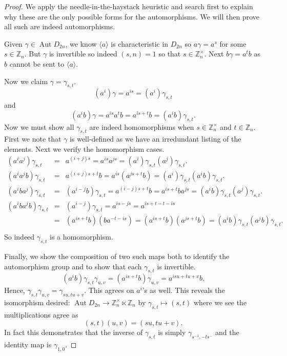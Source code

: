 \documentclass[12pt]{article}
\DeclareMathOperator{\Aut}{Aut }
\begin{document}
\begin{proof}
We apply the needle-in-the-haystack heuristic and search first to
explain why these are the only possible forms for the automorphisms.
We will then prove all such are indeed automorphisms.

Given $\gamma\in \Aut D_{2n}$, we know $\langle a\rangle$ is characteristic
in $D_{2n}$ so $a\gamma=a^s$ for some $s\in \mathbb{Z}_n$.  But $\gamma$ is invertible
so indeed $(s,n)=1$ so that $s\in \mathbb{Z}_n^\times$.  Next $b\gamma=a^t b$
as $b$ cannot be sent to $\langle a\rangle$.

Now we claim $\gamma=\gamma_{s,t}$.
\[(a^i)\gamma=a^{is}=(a^i)\gamma_{s,t}\]
and 
\[(a^i b)\gamma=a^{is} a^tb=a^{is+t}b=(a^ib)\gamma_{s,t}.\]
Now we must show all $\gamma_{s,t}$ are indeed homomorphisms when 
$s\in \mathbb{Z}_n^\times$ and $t\in \mathbb{Z}_n$.  First we note that $\gamma$ is well-defined as we have an irredundant listing of the elements.  Next we verify the homomorphism cases.
\begin{eqnarray*}
(a^i a^j)\gamma_{s,t} & = & a^{(i+j)s} =a^{is}a^{js}=(a^i)\gamma_{s,t}(a^j)\gamma_{s,t}.\\
(a^i a^j b)\gamma_{s,t} & = & a^{(i+j)s +t}b=a^{is} (a^{js+t}b)
	=(a^i)\gamma_{s,t}(a^i b)\gamma_{s,t}.\\
(a^ib a^j)\gamma_{s,t} & = & (a^{i-j}b)\gamma_{s,t}=a^{(i-j)s+t}b = a^{is+t}b a^{js}
	= (a^ib)\gamma_{s,t} (a^j)\gamma_{s,t}.\\
(a^iba^jb)\gamma_{s,t} & = & (a^{i-j})\gamma_{s,t} = a^{is-js}=a^{is +t -t -is}\\
	& = & (a^{is+t}b)(ba^{-t-is})=(a^{is+t}b)(a^{js+t}b)=(a^ib)\gamma_{s,t}(a^jb)\gamma_{s,t}.\\
\end{eqnarray*}
So indeed $\gamma_{s,t}$ is a homomorphism.

Finally, we show the composition of two such maps both to identify
the automorphism group and to show that each $\gamma_{s,t}$ is invertible.
\[(a^ib)\gamma_{s,t}\gamma_{u,v}=(a^{is+t}b)\gamma_{u,v}=a^{isu+tu+v}b.\]
Hence, $\gamma_{s,t}\gamma_{u,v}=\gamma_{su,tu+v}$.  This agrees on $a^i$'s as well.
This reveals the isomorphism desired: $\Aut D_{2n}\rightarrow\mathbb{Z}_n^\times \ltimes \mathbb{Z}_n$ by $\gamma_{s,t}\mapsto (s,t)$ where we see the multiplications agree as
\[(s,t)(u,v)=(su,tu+v).\]
In fact this demonstrates that the inverse of $\gamma_{s,t}$ is simply
$\gamma_{s^{-1},-ts^{-}}$ and the identity map is $\gamma_{1,0}$.
\end{proof}


\end{document}
